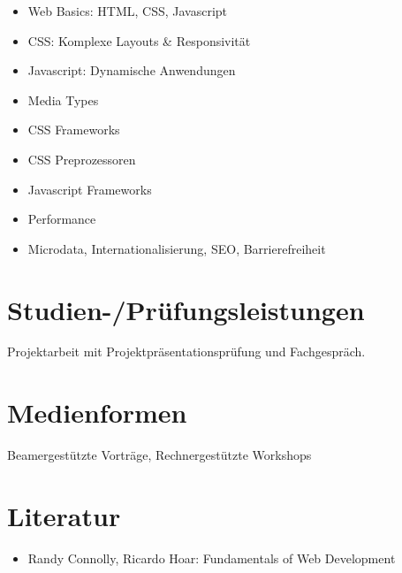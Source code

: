 \begin{itemize}
\tightlist
\item
  Web Basics: HTML, CSS, Javascript
\item
  CSS: Komplexe Layouts \& Responsivität
\item
  Javascript: Dynamische Anwendungen
\item
  Media Types
\item
  CSS Frameworks
\item
  CSS Preprozessoren
\item
  Javascript Frameworks
\item
  Performance
\item
  Microdata, Internationalisierung, SEO, Barrierefreiheit
\end{itemize}

\hypertarget{studien-pruxfcfungsleistungenpathlabelmi-2017modulbeschreibungen-bachelorba_wd_frontend-development}{%
\section*{Studien-/Prüfungsleistungen\label{/mi-2017/modulbeschreibungen-bachelor/BA_WD_Frontend-Development}}\label{studien-pruxfcfungsleistungenpathlabelmi-2017modulbeschreibungen-bachelorba_wd_frontend-development}}

Projektarbeit mit Projektpräsentationsprüfung und Fachgespräch.

\hypertarget{medienformenpathlabelmi-2017modulbeschreibungen-bachelorba_wd_frontend-development}{%
\section*{Medienformen\label{/mi-2017/modulbeschreibungen-bachelor/BA_WD_Frontend-Development}}\label{medienformenpathlabelmi-2017modulbeschreibungen-bachelorba_wd_frontend-development}}

Beamergestützte Vorträge, Rechnergestützte Workshops

\hypertarget{literaturpathlabelmi-2017modulbeschreibungen-bachelorba_wd_frontend-development}{%
\section*{Literatur\label{/mi-2017/modulbeschreibungen-bachelor/BA_WD_Frontend-Development}}\label{literaturpathlabelmi-2017modulbeschreibungen-bachelorba_wd_frontend-development}}

\begin{itemize}
\tightlist
\item
  Randy Connolly, Ricardo Hoar: Fundamentals of Web Development
\end{itemize}

